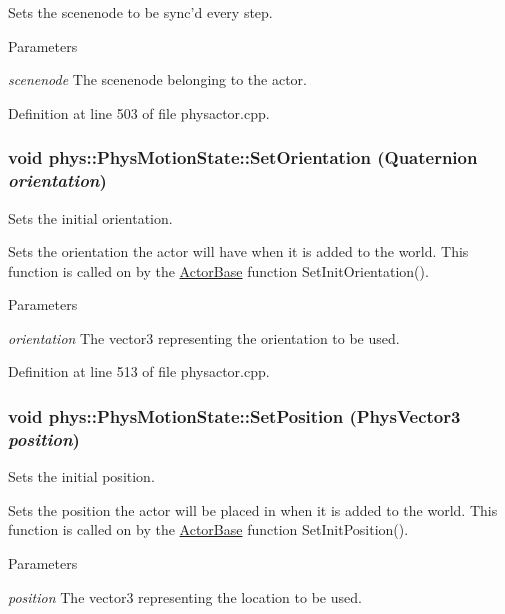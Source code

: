 Sets the scenenode to be sync'd every step. 
\begin{DoxyParams}{Parameters}
\item[{\em scenenode}]The scenenode belonging to the actor. \end{DoxyParams}


Definition at line 503 of file physactor.cpp.

\hypertarget{classphys_1_1PhysMotionState_ac799070edfea4d1c442e3ed0857bcb1d}{
\subsubsection[{SetOrientation}]{\setlength{\rightskip}{0pt plus 5cm}void phys::PhysMotionState::SetOrientation ({\bf Quaternion} {\em orientation})}}
\label{dc/d0d/classphys_1_1PhysMotionState_ac799070edfea4d1c442e3ed0857bcb1d}


Sets the initial orientation. 

Sets the orientation the actor will have when it is added to the world. This function is called on by the \hyperlink{classphys_1_1ActorBase}{ActorBase} function SetInitOrientation(). 
\begin{DoxyParams}{Parameters}
\item[{\em orientation}]The vector3 representing the orientation to be used. \end{DoxyParams}


Definition at line 513 of file physactor.cpp.

\hypertarget{classphys_1_1PhysMotionState_a083029e5dbcfafd573d47331ff8660cb}{
\subsubsection[{SetPosition}]{\setlength{\rightskip}{0pt plus 5cm}void phys::PhysMotionState::SetPosition ({\bf PhysVector3} {\em position})}}
\label{dc/d0d/classphys_1_1PhysMotionState_a083029e5dbcfafd573d47331ff8660cb}


Sets the initial position. 

Sets the position the actor will be placed in when it is added to the world. This function is called on by the \hyperlink{classphys_1_1ActorBase}{ActorBase} function SetInitPosition(). 
\begin{DoxyParams}{Parameters}
\item[{\em position}]The vector3 representing the location to be used. \end{DoxyParams}


